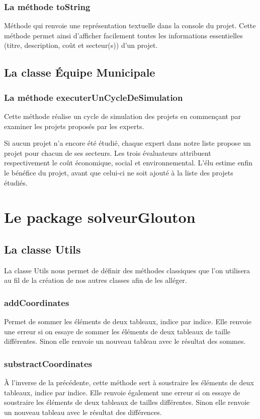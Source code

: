 \documentclass[11pt]{article}
\begin{document}
\subsubsection{La méthode toString}
Méthode qui renvoie une représentation textuelle dans la console du projet. Cette méthode permet ainsi d’afficher facilement toutes les informations essentielles (titre, description, coût et secteur(s)) d’un projet.

\subsection{La classe Équipe Municipale}

\subsubsection{La méthode executerUnCycleDeSimulation}

Cette méthode réalise un cycle de simulation des projets en commençant par examiner les projets proposés par les experts. 

Si aucun projet n’a encore été étudié, chaque expert dans notre liste propose un projet pour chacun de ses secteurs. Les trois évaluateurs attribuent respectivement le coût économique, social et environnemental. L’élu estime enfin le bénéfice du projet, avant que celui-ci ne soit ajouté à la liste des projets étudiés.
\section{Le package solveurGlouton}
\subsection{La classe Utils}
La classe Utils nous permet de définir des méthodes classiques que l’on utilisera au fil de la création de nos autres classes afin de les alléger.

\subsubsection{addCoordinates}
Permet de sommer les éléments de deux tableaux, indice par indice. Elle renvoie une erreur si on essaye de sommer les éléments de deux tableaux de taille différentes. Sinon elle renvoie un nouveau tableau avec le résultat des sommes. 

\subsubsection{substractCoordinates}
À l’inverse de la précédente, cette méthode sert à soustraire les éléments de deux tableaux, indice par indice. Elle renvoie également une erreur si on essaye de soustraire les éléments de deux tableaux de tailles différentes. Sinon elle renvoie un nouveau tableau avec le résultat des différences.
\end{document}
